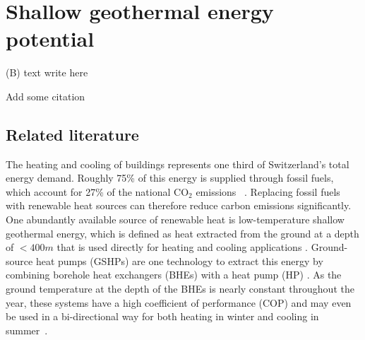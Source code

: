 \chapter{Shallow geothermal energy potential}
\label{geothermal}

\vspace{-15pt}
\begin{tcolorbox}[enhanced,width=\textwidth,size=fbox,
        sharp corners,colframe=black!5!white,drop fuzzy shadow southeast] %
(B) text write here

Add some citation
\end{tcolorbox}

\section{Related literature}
\label{geo_intro}
The heating and cooling of buildings represents one third of Switzerland's total energy demand. Roughly 75\% of this energy is supplied through fossil fuels, which account for 27\% of the national CO$_2$ emissions ~\cite{bauer_faktensammlung_2019}. 
Replacing fossil fuels with renewable heat sources can therefore reduce carbon emissions significantly. 
One abundantly available source of renewable heat is low-temperature shallow geothermal energy, which is defined as heat extracted from the ground at a depth of $< 400m$ that is used directly for heating and cooling applications  \cite{stauffer_thermal_2013}.
Ground-source heat pumps (GSHPs) are one technology to extract this energy by combining borehole heat exchangers (BHEs) with a heat pump (HP) \cite{florides_ground_2007}. %
As the ground temperature at the depth of the BHEs is nearly constant throughout the year, these systems have a high coefficient of performance (COP) and may even be used in a bi-directional way for both heating in winter and cooling in summer~\cite{sanner_current_2003}.

